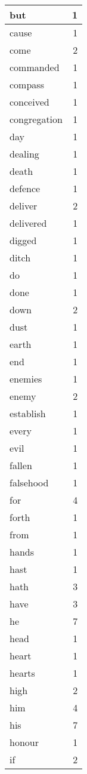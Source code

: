 \begin{center}
\begin{longtable}{l|r}
but & 1 \\ \hline
cause & 1 \\ \hline
come & 2 \\ \hline
commanded & 1 \\ \hline
compass & 1 \\ \hline
conceived & 1 \\ \hline
congregation & 1 \\ \hline
day & 1 \\ \hline
dealing & 1 \\ \hline
death & 1 \\ \hline
defence & 1 \\ \hline
deliver & 2 \\ \hline
delivered & 1 \\ \hline
digged & 1 \\ \hline
ditch & 1 \\ \hline
do & 1 \\ \hline
done & 1 \\ \hline
down & 2 \\ \hline
dust & 1 \\ \hline
earth & 1 \\ \hline
end & 1 \\ \hline
enemies & 1 \\ \hline
enemy & 2 \\ \hline
establish & 1 \\ \hline
every & 1 \\ \hline
evil & 1 \\ \hline
fallen & 1 \\ \hline
falsehood & 1 \\ \hline
for & 4 \\ \hline
forth & 1 \\ \hline
from & 1 \\ \hline
hands & 1 \\ \hline
hast & 1 \\ \hline
hath & 3 \\ \hline
have & 3 \\ \hline
he & 7 \\ \hline
head & 1 \\ \hline
heart & 1 \\ \hline
hearts & 1 \\ \hline
high & 2 \\ \hline
him & 4 \\ \hline
his & 7 \\ \hline
honour & 1 \\ \hline
if & 2 \\ \hline

\end{longtable}
\end{center}

